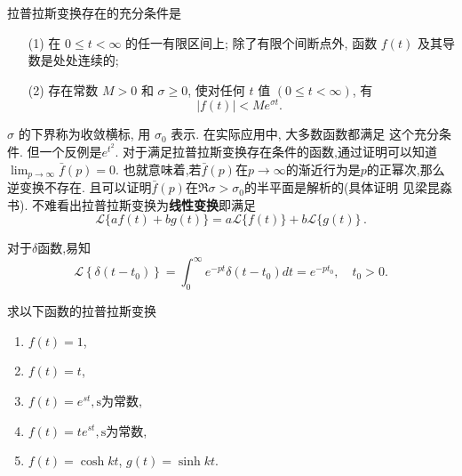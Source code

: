 拉普拉斯变换存在的充分条件是 
\begin{enumerate}
    \item[(1)]  在 $0 \leqslant t<\infty$ 的任一有限区间上; 除了有限个间断点外, 函数 $f(t)$ 及其导数是处处连续的;
    \item[(2)]  存在常数 $M>0$ 和 $\sigma \geqslant 0$, 使对任何 $t$ 值 $(0 \leqslant t<\infty)$, 有
    $$
    |f(t)|<M e^{\sigma t} \text {. }
    $$
\end{enumerate}
$\sigma$ 的下界称为收敛横标, 用 $\sigma_0$ 表示. 在实际应用中, 大多数函数都满足 这个充分条件.
但一个反例是$e^{t^2}$. 对于满足拉普拉斯变换存在条件的函数,通过证明可以知道$\lim_{p\to \infty} \bar{f}(p) = 0$.
也就意味着,若$\bar{f}(p)$在$p\to \infty$的渐近行为是$p$的正幂次,那么逆变换不存在. 且可以证明$\bar{f}(p)$在$\Re \sigma > \sigma_0$的半平面是解析的(具体证明
见梁昆淼书).
不难看出拉普拉斯变换为\textbf{线性变换}即满足
$$
\mathcal{L}\{a f(t)+b g(t)\}=a \mathcal{L}\{f(t)\}+b \mathcal{L}\{g(t)\} \,.
$$

对于$\delta$函数,易知
$$
\mathcal{L}\left\{\delta\left(t-t_0\right)\right\}=\int_0^{\infty} e^{-p t} \delta\left(t-t_0\right) d t=e^{-p t_0},  \quad t_0>0 .
$$
\begin{example}
    求以下函数的拉普拉斯变换
    \begin{enumerate}
        \item $f(t) = 1$,
        \item $f(t) = t$,
        \item $f(t) =e^{s t}, \textrm{s为常数}$,
        \item $f(t) = t e^{s t}, \textrm{s为常数}$,
        \item $f(t) = \cosh {k t}$, $g(t)= \sinh {kt}$.
    \end{enumerate}
\end{example}

